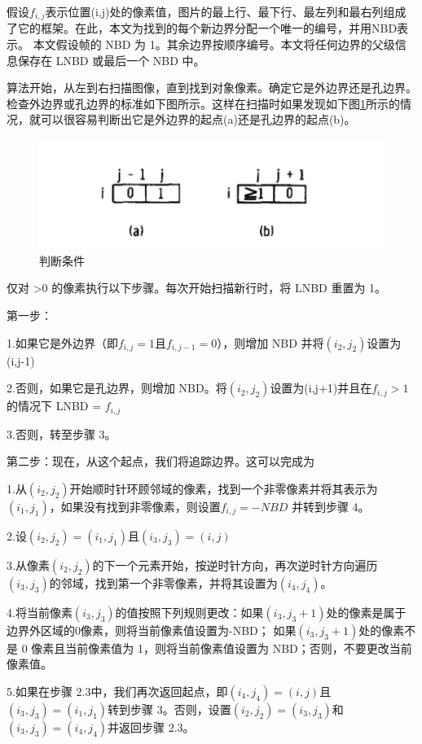 假设$f_{i,j}$表示位置(i,j)处的像素值，图片的最上行、最下行、最左列和最右列组成了它的框架。在此，本文为找到的每个新边界分配一个唯一的编号，并用NBD表示。
本文假设帧的 NBD 为 1。其余边界按顺序编号。本文将任何边界的父级信息保存在 LNBD 或最后一个 NBD 中。

算法开始，从左到右扫描图像，直到找到对象像素。确定它是外边界还是孔边界。检查外边界或孔边界的标准如下图所示。这样在扫描时如果发现如下图\ref{18}所示的情况，就可以很容易判断出它是外边界的起点(a)还是孔边界的起点(b)。
\begin{figure}[ht]
    \centering
    \includegraphics[width=\textwidth]{figures/algorithm_condition.png}
    \caption{判断条件}
    \label{18}
\end{figure}


仅对 >0 的像素执行以下步骤。每次开始扫描新行时，将 LNBD 重置为 1。

第一步：

1.如果它是外边界（即$f_{i,j}=1$且$f_{i,j-1}=0$），则增加 NBD 并将$(i_2,j_2)$设置为(i,j-1)

2.否则，如果它是孔边界，则增加 NBD。将$(i_2,j_2)$设置为(i,j+1)并且在$f_{i,j}>1$的情况下 LNBD = $f_{i,j}$

3.否则，转至步骤 3。

第二步：现在，从这个起点，我们将追踪边界。这可以完成为

1.从$(i_2,j_2)$开始顺时针环顾邻域的像素，找到一个非零像素并将其表示为$(i_1,j_1)$，如果没有找到非零像素，则设置$f_{i,j}=-NBD$ 并转到步骤 4。

2.设$(i_2,j_2)=(i_1,j_1)$且$(i_3,j_3)=(i,j)$

3.从像素$(i_2,j_2)$的下一个元素开始，按逆时针方向，再次逆时针方向遍历$(i_3,j_3)$的邻域，找到第一个非零像素，并将其设置为$(i_4,j_4)$。

4.将当前像素$(i_3,j_3)$的值按照下列规则更改：如果$(i_3,j_3+1)$处的像素是属于边界外区域的0像素，则将当前像素值设置为-NBD；
如果$(i_3,j_3+1)$处的像素不是 0 像素且当前像素值为 1，则将当前像素值设置为 NBD；否则，不要更改当前像素值。

5.如果在步骤 2.3中，我们再次返回起点，即$(i_4,j_4)=(i,j)$且$(i_3,j_3)=(i_1,j_1)$转到步骤 3。否则，设置$(i_2,j_2)=(i_3,j_3)$和$(i_3,j_3)=(i_4,j_4)$并返回步骤 2.3。

